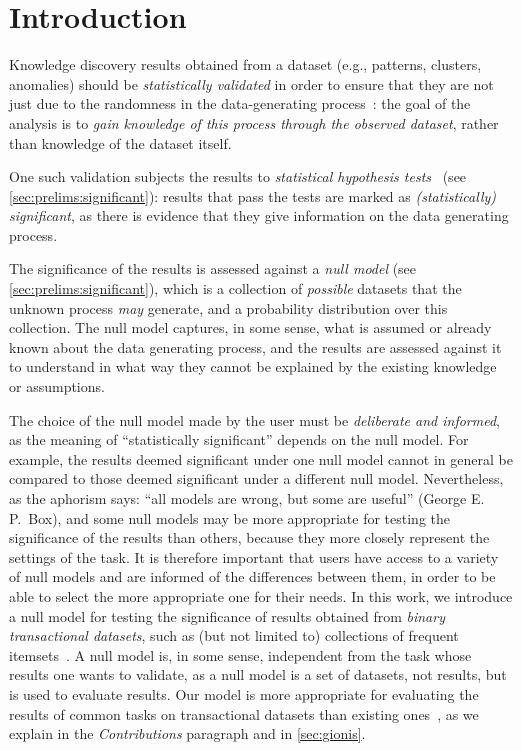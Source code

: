 \chapter{Introduction}\label{sec:intro}

Knowledge discovery results obtained from a dataset (e.g., patterns,
clusters, anomalies) should be \emph{statistically validated} in order to ensure
that they are not just due to the randomness in the data-generating
process~\citep{GionisMMT07,HamalainenW19,PellegrinaRV19b}: the goal of the
analysis is to \emph{gain knowledge of this process through the observed
dataset}, rather than knowledge of the dataset itself.

One such validation subjects the results to \emph{statistical hypothesis
tests}~\citep[Ch.\ 10]{Wasserman05} (see \cref{sec:prelims:significant}):
results that pass the tests are marked as \emph{(statistically) significant}, as
there is evidence that they give information on the data generating process.

The significance of the results is assessed against a \emph{null model} (see
\cref{sec:prelims:significant}), which is a collection of \emph{possible}
datasets that the unknown process \emph{may} generate, and a probability
distribution over this collection. The null model captures, in some sense, what
is assumed or already known about the data generating process, and the results
are assessed against it to understand in what way they cannot be explained by
the existing knowledge or assumptions.

The choice of the null model made by the user must be \emph{deliberate and informed},
as the meaning of ``statistically significant'' depends on the null model. For
example, the results deemed significant under one null model cannot in general
be compared to those deemed significant under a different null model.
Nevertheless, as the aphorism says: ``all models are wrong, but some are
useful'' (George E.\,P.\ Box), and some null models may be more appropriate for
testing the significance of the results than others, because they more closely
represent the settings of the task. It is therefore important that users have
access to a variety of null models and are informed of the differences between
them, in order to be able to select the more appropriate one for their needs. In
this work, we introduce a null model for testing the significance of results
obtained from \emph{binary transactional datasets}, such as (but not limited to)
collections of frequent itemsets~\citep{AgrawalS94}. A null model is, in some
sense, independent from the task whose results one wants to validate, as a null
model is a set of datasets, not results, but is used to evaluate results. Our
model is more appropriate for evaluating the results of common tasks on
transactional datasets than existing ones~\citep{GionisMMT07}, as we explain in
the \emph{Contributions} paragraph and in \cref{sec:gionis}.

